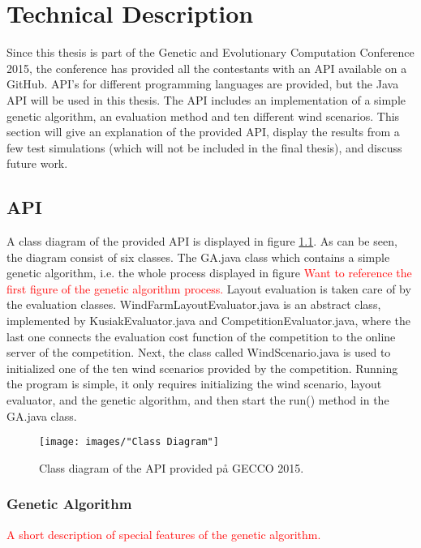\chapter{Technical Description}


Since this thesis is part of the Genetic and Evolutionary Computation Conference 2015, the conference has provided all the contestants with an API available on a GitHub. API's for different programming languages are provided, but the Java API will be used in this thesis. The API includes an implementation of a simple genetic algorithm, an evaluation method and ten different wind scenarios. This section will give an explanation of the provided API, display the results from a few test simulations (which will not be included in the final thesis), and discuss future work.


\section{API}


A class diagram of the provided API is displayed in figure \ref{Class Diagram}. As can be seen, the diagram consist of six classes. The GA.java class which contains a simple genetic algorithm, i.e. the whole process displayed in figure \textcolor{red}{Want to reference the first figure of the genetic algorithm process.} Layout evaluation is taken care of by the evaluation classes. WindFarmLayoutEvaluator.java is an abstract class, implemented by KusiakEvaluator.java and CompetitionEvaluator.java, where the last one connects the evaluation cost function of the competition to the online server of the competition. Next, the class called WindScenario.java is used to initialized one of the ten wind scenarios provided by the competition. Running the program is simple, it only requires initializing the wind scenario, layout evaluator, and the genetic algorithm, and then start the run() method in the GA.java class.


\begin{figure}[h!]
\begin{center}
\texttt{[image: images/"Class Diagram"]}
\caption{Class diagram of the API provided på GECCO 2015.}
\label{Class Diagram}
\end{center}
\end{figure}


\subsection{Genetic Algorithm}
\textcolor{red}{A short description of special features of the genetic algorithm.}



